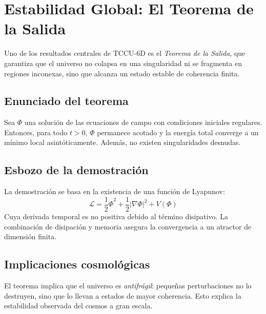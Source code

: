 \chapter{Estabilidad Global: El Teorema de la Salida}
Uno de los resultados centrales de TCCU-6D es el \emph{Teorema de la Salida}, que garantiza que el universo no colapsa en una singularidad ni se fragmenta en regiones inconexas, sino que alcanza un estado estable de coherencia finita.

\section{Enunciado del teorema}
Sea $\Phi$ una solución de las ecuaciones de campo con condiciones iniciales regulares. Entonces, para todo $t > 0$, $\Phi$ permanece acotado y la energía total converge a un mínimo local asintóticamente. Además, no existen singularidades desnudas.

\section{Esbozo de la demostración}
La demostración se basa en la existencia de una función de Lyapunov:
\begin{equation}
\mathcal{L} = \frac{1}{2}\dot{\Phi}^2 + \frac{1}{2}|\nabla\Phi|^2 + V(\Phi)
\end{equation}
Cuya derivada temporal es no positiva debido al término disipativo. La combinación de disipación y memoria asegura la convergencia a un atractor de dimensión finita.

\section{Implicaciones cosmológicas}
El teorema implica que el universo es \emph{antifrágil}: pequeñas perturbaciones no lo destruyen, sino que lo llevan a estados de mayor coherencia. Esto explica la estabilidad observada del cosmos a gran escala.
